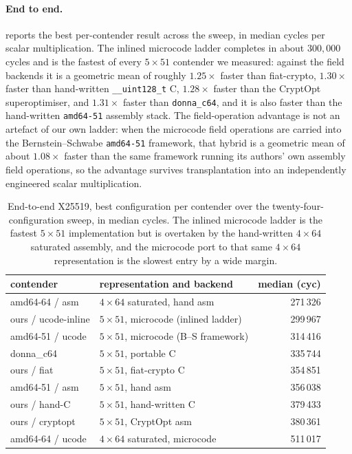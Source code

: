 \paragraph{End to end.}
 reports the best per-contender result across the sweep, in
median cycles per scalar multiplication. The inlined microcode ladder completes in
about $300{,}000$ cycles and is the fastest of every $5\times51$ contender we
measured: against the field backends it is a geometric mean of roughly $1.25\times$
faster than fiat-crypto, $1.30\times$ faster than hand-written
\texttt{\_\_uint128\_t} C, $1.28\times$ faster than the CryptOpt superoptimiser,
and $1.31\times$ faster than \texttt{donna\_c64}, and it is also faster than the
hand-written \texttt{amd64-51} assembly stack. The field-operation advantage is
not an artefact of our own ladder: when the microcode field operations are carried
into the Bernstein--Schwabe \texttt{amd64-51} framework, that hybrid is a geometric
mean of about $1.08\times$ faster than the same framework running its authors' own
assembly field operations, so the advantage survives transplantation into an
independently engineered scalar multiplication.

\begin{table}[t]
\centering
\caption{End-to-end X25519, best configuration per contender over the
twenty-four-configuration sweep, in median cycles. The inlined microcode ladder is
the fastest $5\times51$ implementation but is overtaken by the hand-written
$4\times64$ saturated assembly, and the microcode port to that same $4\times64$
representation is the slowest entry by a wide margin.}
\label{tab:c25519-e2e}
\small
\begin{tabular}{@{}llr@{}}
\toprule
contender & representation and backend & median (cyc) \\
\midrule
amd64-64 / asm        & $4\times64$ saturated, hand asm           & 271\,326 \\
ours / ucode-inline   & $5\times51$, microcode (inlined ladder)   & 299\,967 \\
amd64-51 / ucode      & $5\times51$, microcode (B--S framework)   & 314\,416 \\
donna\_c64            & $5\times51$, portable C                   & 335\,744 \\
ours / fiat           & $5\times51$, fiat-crypto C                & 354\,851 \\
amd64-51 / asm        & $5\times51$, hand asm                     & 356\,038 \\
ours / hand-C         & $5\times51$, hand-written C               & 379\,433 \\
ours / cryptopt       & $5\times51$, CryptOpt asm                 & 380\,361 \\
amd64-64 / ucode      & $4\times64$ saturated, microcode          & 511\,017 \\
\bottomrule
\end{tabular}
\end{table}

